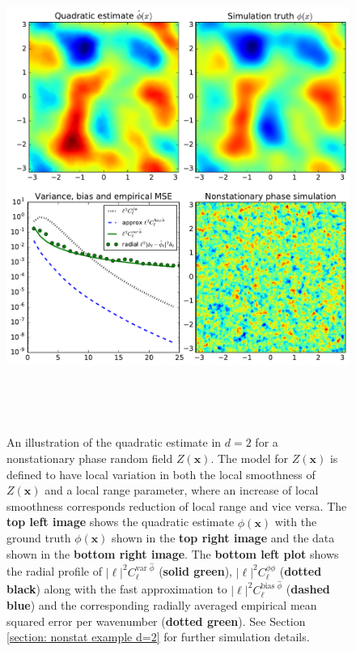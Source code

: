 \documentclass[10pt,noinfoline]{imsart}
\newcommand{\bs}{\boldsymbol}
\begin{document}
\begin{figure}[H]
\includegraphics[height=16cm]{figure4.pdf}%
\caption{An illustration of the quadratic estimate in $d=2$ for a nonstationary phase random field $Z(\bs x)$. The model for $Z(\bs x)$ is defined to have local variation in both the local smoothness of $Z(\bs x)$ and a local range parameter, where an increase of local smoothness corresponds reduction of local range and vice versa. The \textbf{top left image} shows the quadratic estimate $\hat\phi(\bs x)$ with the  ground truth $\phi(\bs x)$ shown in the \textbf{top right image} and the data shown in the \textbf{bottom right image}.  The \textbf{bottom left plot} shows the radial profile of  $|\bs \ell|^2C_{\bs \ell}^{\text{var }\hat\phi}$ (\textbf{solid green}), $|\bs \ell|^2C_{\bs \ell}^{\phi\phi}$ (\textbf{dotted black}) along with the fast approximation to $|\bs \ell|^2C_{\bs \ell}^{\text{bias }\hat\phi}$ (\textbf{dashed blue}) and the corresponding radially averaged empirical mean squared error per wavenumber (\textbf{dotted green}). See Section \ref{section: nonstat example d=2} for further simulation details.
 }
\label{Figure 3}
\end{figure}
\end{document}
